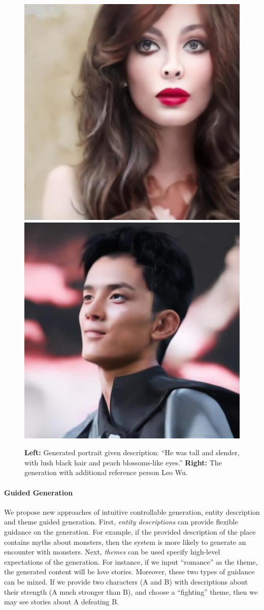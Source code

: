 \documentclass{article}
\begin{document}
\begin{figure}[t]
    \centering
    \includegraphics[width=0.48\columnwidth]{figures/gen_3.jpg}
    \includegraphics[width=0.48\columnwidth]{figures/gen_1.jpg}
    \caption[caption]{\textbf{Left:} Generated portrait given description: ``He was tall and slender, with lush black hair and peach blossoms-like eyes.'' \textbf{Right:} The generation with additional reference person Leo Wu.}
    \label{fig:portrait}
\end{figure}

\paragraph{Guided Generation} We propose new approaches of intuitive controllable generation, entity description and theme guided generation. First, \textit{entity descriptions} can provide flexible guidance on the generation. For example, if the provided description of the place contains myths about monsters, then the system is more likely to 
generate an encounter with monsters. Next, \textit{themes} can be used specify high-level expectations of the generation. For instance, if we input ``romance'' as the theme, the generated content will be love stories. Moreover, these two types of 
guidance can be mixed. If we provide two characters (A and B) with descriptions about 
their strength (A much stronger than B), and choose a ``fighting'' theme, 
then we may see stories about A defeating B.
\end{document}
